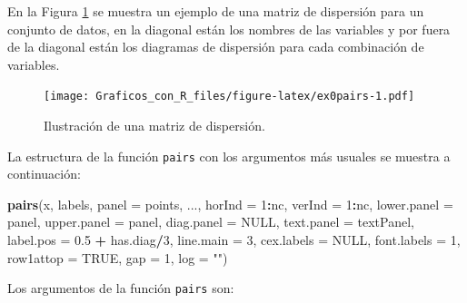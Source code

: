 \documentclass[10pt,]{krantz}
\makeatletter
\newenvironment{Shaded}{\begin{snugshade}}{\end{snugshade}}
\newcommand{\KeywordTok}[1]{\textcolor[rgb]{0.13,0.29,0.53}{\textbf{#1}}}
\newcommand{\DataTypeTok}[1]{\textcolor[rgb]{0.13,0.29,0.53}{#1}}
\newcommand{\DecValTok}[1]{\textcolor[rgb]{0.00,0.00,0.81}{#1}}
\newcommand{\FloatTok}[1]{\textcolor[rgb]{0.00,0.00,0.81}{#1}}
\newcommand{\StringTok}[1]{\textcolor[rgb]{0.31,0.60,0.02}{#1}}
\newcommand{\OtherTok}[1]{\textcolor[rgb]{0.56,0.35,0.01}{#1}}
\newcommand{\OperatorTok}[1]{\textcolor[rgb]{0.81,0.36,0.00}{\textbf{#1}}}
\newcommand{\NormalTok}[1]{#1}
\newenvironment{kframe}{%
\medskip{}
\setlength{\fboxsep}{.8em}
 \def\at@end@of@kframe{}%
 \ifinner\ifhmode%
  \def\at@end@of@kframe{\end{minipage}}%
  \begin{minipage}{\columnwidth}%
 \fi\fi%
 \def\FrameCommand##1{\hskip\@totalleftmargin \hskip-\fboxsep
 \colorbox{shadecolor}{##1}\hskip-\fboxsep
     \hskip-\linewidth \hskip-\@totalleftmargin \hskip\columnwidth}%
 \MakeFramed {\advance\hsize-\width
   \@totalleftmargin\z@ \linewidth\hsize
   \@setminipage}}%
 {\par\unskip\endMakeFramed%
 \at@end@of@kframe}
\renewenvironment{Shaded}{\begin{kframe}}{\end{kframe}}
\makeatother
\begin{document}
En la Figura \ref{fig:ex0pairs} se muestra un ejemplo de una matriz de
dispersión para un conjunto de datos, en la diagonal están los nombres
de las variables y por fuera de la diagonal están los diagramas de
dispersión para cada combinación de variables.

\begin{figure}
\centering
\texttt{[image: Graficos\_con\_R\_files/figure-latex/ex0pairs-1.pdf]}
\caption{\label{fig:ex0pairs}Ilustración de una matriz de dispersión.}
\end{figure}

La estructura de la función \texttt{pairs} con los argumentos más
usuales se muestra a continuación:

\begin{Shaded}
\begin{Highlighting}[]
\KeywordTok{pairs}\NormalTok{(x, labels, }\DataTypeTok{panel =}\NormalTok{ points, ...,}
      \DataTypeTok{horInd =} \DecValTok{1}\OperatorTok{:}\NormalTok{nc, }\DataTypeTok{verInd =} \DecValTok{1}\OperatorTok{:}\NormalTok{nc,}
      \DataTypeTok{lower.panel =}\NormalTok{ panel, }\DataTypeTok{upper.panel =}\NormalTok{ panel,}
      \DataTypeTok{diag.panel =} \OtherTok{NULL}\NormalTok{, }\DataTypeTok{text.panel =}\NormalTok{ textPanel,}
      \DataTypeTok{label.pos =} \FloatTok{0.5} \OperatorTok{+}\StringTok{ }\NormalTok{has.diag}\OperatorTok{/}\DecValTok{3}\NormalTok{, }\DataTypeTok{line.main =} \DecValTok{3}\NormalTok{,}
      \DataTypeTok{cex.labels =} \OtherTok{NULL}\NormalTok{, }\DataTypeTok{font.labels =} \DecValTok{1}\NormalTok{,}
      \DataTypeTok{row1attop =} \OtherTok{TRUE}\NormalTok{, }\DataTypeTok{gap =} \DecValTok{1}\NormalTok{, }\DataTypeTok{log =} \StringTok{""}\NormalTok{)}
\end{Highlighting}
\end{Shaded}

Los argumentos de la función \texttt{pairs} son:
\end{document}
